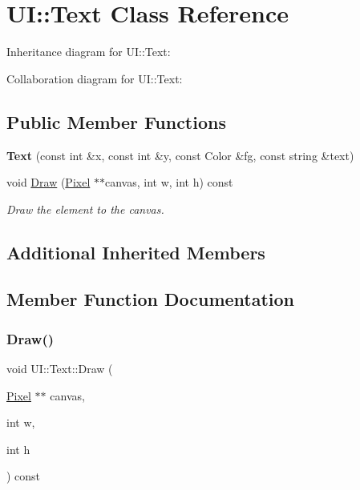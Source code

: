 \hypertarget{classUI_1_1Text}{}\section{UI\+:\+:Text Class Reference}
\label{classUI_1_1Text}


Inheritance diagram for UI\+:\+:Text\+:


Collaboration diagram for UI\+:\+:Text\+:
\subsection*{Public Member Functions}
\begin{DoxyCompactItemize}
\item 
\mbox{\label{classUI_1_1Text_a426d2e880bd66e3d23fd1da1f122bb64}} 
{\bfseries Text} (const int \&x, const int \&y, const Color \&fg, const string \&text)
\item 
void \hyperlink{classUI_1_1Text_a143fb4a80460ca6e470f577122c52734}{Draw} (\hyperlink{classUI_1_1Pixel}{Pixel} $\ast$$\ast$canvas, int w, int h) const
\begin{DoxyCompactList}\small\item\em Draw the element to the canvas. \end{DoxyCompactList}\end{DoxyCompactItemize}
\subsection*{Additional Inherited Members}


\subsection{Member Function Documentation}
\mbox{\label{classUI_1_1Text_a143fb4a80460ca6e470f577122c52734}} 
\subsubsection{\texorpdfstring{Draw()}{Draw()}}
{\footnotesize\ttfamily void U\+I\+::\+Text\+::\+Draw (\begin{DoxyParamCaption}\item[{\hyperlink{classUI_1_1Pixel}{Pixel} $\ast$$\ast$}]{canvas,  }\item[{int}]{w,  }\item[{int}]{h }\end{DoxyParamCaption}) const\hspace{0.3cm}{\ttfamily [virtual]}}



